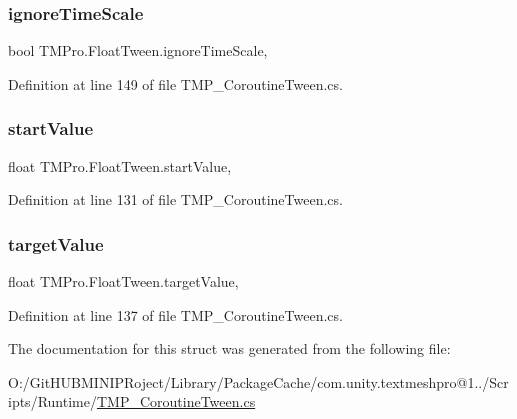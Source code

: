\subsubsection{\texorpdfstring{ignoreTimeScale}{ignoreTimeScale}}
{\footnotesize\ttfamily bool T\+M\+Pro.\+Float\+Tween.\+ignore\+Time\+Scale\hspace{0.3cm}{\ttfamily [get]}, {\ttfamily [set]}}



Definition at line 149 of file T\+M\+P\+\_\+\+Coroutine\+Tween.\+cs.

\mbox{\label{struct_t_m_pro_1_1_float_tween_a5a567005f8103ed38c69863060034a9c}} 
\subsubsection{\texorpdfstring{startValue}{startValue}}
{\footnotesize\ttfamily float T\+M\+Pro.\+Float\+Tween.\+start\+Value\hspace{0.3cm}{\ttfamily [get]}, {\ttfamily [set]}}



Definition at line 131 of file T\+M\+P\+\_\+\+Coroutine\+Tween.\+cs.

\mbox{\label{struct_t_m_pro_1_1_float_tween_a6f00d7dd7b7d7478c17b424fb779f3e4}} 
\subsubsection{\texorpdfstring{targetValue}{targetValue}}
{\footnotesize\ttfamily float T\+M\+Pro.\+Float\+Tween.\+target\+Value\hspace{0.3cm}{\ttfamily [get]}, {\ttfamily [set]}}



Definition at line 137 of file T\+M\+P\+\_\+\+Coroutine\+Tween.\+cs.



The documentation for this struct was generated from the following file\+:\begin{DoxyCompactItemize}
\item 
O\+:/\+Git\+H\+U\+B\+M\+I\+N\+I\+P\+Roject/\+Library/\+Package\+Cache/com.\+unity.\+textmeshpro@1../\+Scripts/\+Runtime/\mbox{\hyperlink{_t_m_p___coroutine_tween_8cs}{T\+M\+P\+\_\+\+Coroutine\+Tween.\+cs}}\end{DoxyCompactItemize}
